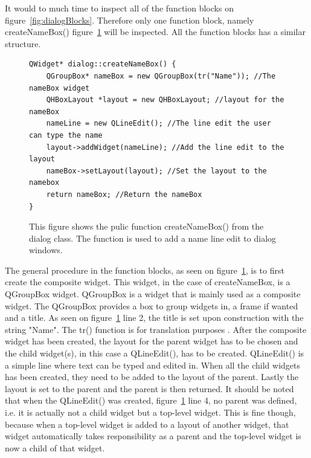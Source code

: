It would to much time to inspect all of the function blocks on figure~\ref{fig:dialogBlocks}. Therefore only one function block, namely createNameBox() figure~\ref{fig:dialogCreateNameBoxCode} will be inspected. All the function blocks has a similar structure.

\begin{figure}[h] %
\centering
\lstset{language=C++} 
\begin{lstlisting}[frame=single]  
QWidget* dialog::createNameBox() {
    QGroupBox* nameBox = new QGroupBox(tr("Name")); //The nameBox widget
    QHBoxLayout *layout = new QHBoxLayout; //layout for the nameBox
    nameLine = new QLineEdit(); //The line edit the user can type the name
    layout->addWidget(nameLine); //Add the line edit to the layout
    nameBox->setLayout(layout); //Set the layout to the namebox
    return nameBox; //Return the nameBox
}
\end{lstlisting}
\caption{This figure shows the pulic function createNameBox() from the dialog class. The function is used to add a name line edit to dialog windows.}
\label{fig:dialogCreateNameBoxCode} 	
\end{figure}

The general procedure in the function blocks, as seen on figure~\ref{fig:dialogCreateNameBoxCode}, is to first create the composite widget. This widget, in the case of createNameBox, is a QGroupBox widget. QGroupBox is a widget that is mainly used as a composite widget. The QGroupBox provides a box to group widgets in, a frame if wanted and a title. As seen on figure~\ref{fig:dialogCreateNameBoxCode} line 2, the title is set upon construction with the string "Name". The tr() function is for translation purposes \cite{QtDocumentationTr}.
After the composite widget has been created, the layout for the parent widget has to be chosen and the child widget(s), in this case a QLineEdit(), has to be created. QLineEdit() is a simple line where text can be typed and edited in. When all the child widgets has been created, they need to be added to the layout of the parent. Lastly the layout is set to the parent and the parent is then returned. It should be noted that when the QLineEdit() was created, figure~\ref{fig:dialogCreateNameBoxCode} line 4, no parent was defined, i.e. it is actually not a child widget but a top-level widget. This is fine though, because when a top-level widget is added to a layout of another widget, that widget automatically takes responsibility as a parent and the top-level widget is now a child of that widget.

